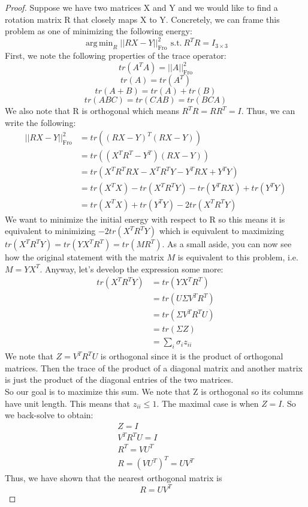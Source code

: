 \documentclass[a4paper,12pt]{article}
\DeclareMathOperator*{\argmin}{arg\,min}
\begin{document}
\begin{proof}
Suppose we have two matrices X and Y and we would like to find a rotation matrix R that closely maps X to Y. Concretely, we can frame this problem as one of minimizing the following energy:
$$
\argmin_{R}||RX - Y||_{\text{Fro}}^{2} \, \ \text{s.t.} \ R^TR = I_{3\times 3}
$$
First, we note the following properties of the trace operator:
$$
tr(A^T A) = ||A||_{\text{Fro}}^2
$$
$$
tr(A) = tr(A^T)
$$
$$
tr(A+B) = tr(A) + tr(B)
$$
$$
tr(ABC) = tr(CAB) = tr(BCA)
$$
We also note that R is orthogonal which means $R^TR = RR^T = I$. Thus, we can write the following:
\begin{align*}
||RX - Y||_{\text{Fro}}^{2} &= tr((RX - Y)^T(RX - Y)) \\
&= tr((X^TR^T - Y^T)(RX - Y)) \\
&= tr(X^TR^TRX - X^TR^TY - Y^TRX + Y^TY) \\
&= tr(X^TX) - tr(X^TR^TY) - tr(Y^TRX) + tr(Y^TY) \\
&= tr(X^TX) + tr(Y^TY) - 2tr(X^TR^TY)
\end{align*}
We want to minimize the initial energy with respect to R so this means it is equivalent to minimizing $- 2tr(X^TR^TY)$ which is equivalent to maximizing $tr(X^TR^TY) = tr(YX^TR^T) = tr(MR^T)$. As a small aside, you can now see how the original statement with the matrix $M$ is equivalent to this problem, i.e. $M = YX^T$. Anyway, let's develop the expression some more:
\begin{align*}
tr(X^TR^TY) &= tr(YX^TR^T) \\
&= tr(U\Sigma V^TR^T) \\
&= tr(\Sigma V^TR^TU) \\
&= tr(\Sigma Z) \\
&= \sum_i \sigma_i z_{ii}
\end{align*}
We note that $Z = V^TR^TU$ is orthogonal since it is the product of orthogonal matrices. Then the trace of the product of a diagonal matrix and another matrix is just the product of the diagonal entries of the two matrices. \\

So our goal is to maximize this sum. We note that Z is orthogonal so its columns have unit length. This means that $z_{ii} \leq 1$. The maximal case is when $Z = I$. So we back-solve to obtain:
\begin{align*}
Z = I \\
V^TR^TU = I \\
R^T = VU^T \\
R = (VU^T)^T = UV^T
\end{align*}
Thus, we have shown that the nearest orthogonal matrix is
$$
\boxed{R = UV^T}
$$
\end{proof}
\end{document}
